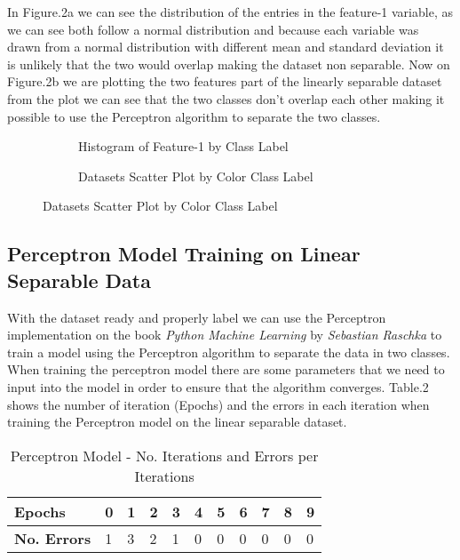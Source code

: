 \documentclass[12pt]{article} %
\begin{document}
In Figure.2a we can see the distribution of the entries in the feature-1 variable, as we can see both follow a normal distribution and because each variable was drawn from a normal distribution with different mean and standard deviation it is unlikely that the two would overlap making the dataset non separable. Now on Figure.2b we are plotting the two features part of the linearly separable dataset from the plot we can see that the two classes don't overlap each other making it possible to use the Perceptron algorithm to separate the two classes.

\begin{figure}[ht]
\caption{Linearly Separable Dataset Plots}\label{fig:linear01}
\hspace*{-1.9cm}
    \begin{subfigure}[b]{0.6\textwidth}
        \caption{Histogram of Feature-1 by Class Label }
        \label{fig:output_2}
    \end{subfigure}
    \begin{subfigure}[b]{0.6\textwidth}
        \caption{Datasets Scatter Plot by Color Class Label}
        \label{fig:output_3}
    \end{subfigure}
\end{figure}

\subsection{Perceptron Model Training on Linear Separable Data}

With the dataset ready and properly label we can use the Perceptron implementation on the book \textit{Python Machine Learning} by \textit{Sebastian Raschka} to train a model using the Perceptron algorithm to separate the data in two classes. When training the perceptron model there are some parameters that we need to input into the model in order to ensure that the algorithm converges. Table.2 shows the number of iteration (Epochs) and the errors in each iteration when training the Perceptron model on the linear separable dataset. 

\begin{table}[ht]
\centering
\caption{Perceptron Model - No. Iterations and Errors per Iterations}
\begin{tabular}{@{}lllllllllll@{}}
\toprule
\textbf{Epochs}     & 0 & 1 & 2 & 3 & 4 & 5 & 6 & 7 & 8 & 9 \\ \midrule
\textbf{No. Errors} & 1 & 3 & 2 & 1 & 0 & 0 & 0 & 0 & 0 & 0 \\ \bottomrule
\end{tabular}
\end{table}
\end{document}

